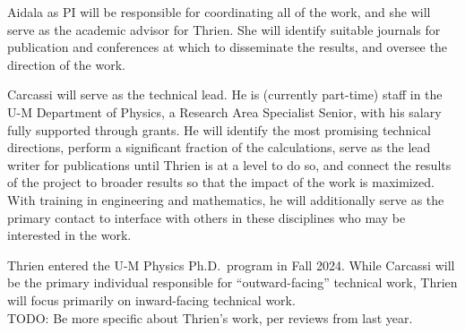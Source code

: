 Aidala as PI will be responsible for coordinating all of the work, and she will serve as the academic advisor for Thrien.  She will identify suitable journals for publication and conferences at which to disseminate the results, and oversee the direction of the work.  

Carcassi will serve as the technical lead.  He is (currently part-time) staff in the U-M Department of Physics, a Research Area Specialist Senior, with his salary fully supported through grants.  He will identify the most promising technical directions, perform a significant fraction of the calculations, serve as the lead writer for publications until Thrien is at a level to do so, and connect the results of the project to broader results so that the impact of the work is maximized.  With training in engineering and mathematics, he will additionally serve as the primary contact to interface with others in these disciplines who may be interested in the work.

Thrien entered the U-M Physics Ph.D.~program in Fall 2024.  While Carcassi will be the primary individual responsible for ``outward-facing'' technical work, Thrien will focus primarily on inward-facing technical work.  \\
TODO: Be more specific about Thrien's work, per reviews from last year.






